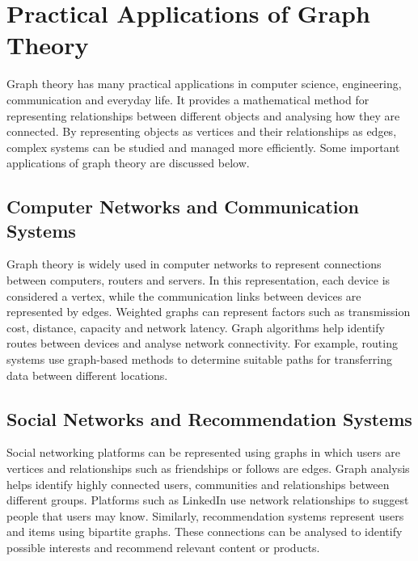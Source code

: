 \documentclass[12pt,a4paper]{article}
\begin{document}

\section{Practical Applications of Graph Theory}

Graph theory has many practical applications in computer science,
engineering, communication and everyday life. It provides a
mathematical method for representing relationships between
different objects and analysing how they are connected. By
representing objects as vertices and their relationships as
edges, complex systems can be studied and managed more
efficiently. Some important applications of graph theory are
discussed below.

\subsection{Computer Networks and Communication Systems}

Graph theory is widely used in computer networks to represent
connections between computers, routers and servers. In this
representation, each device is considered a vertex, while the
communication links between devices are represented by edges.
Weighted graphs can represent factors such as transmission
cost, distance, capacity and network latency. Graph algorithms
help identify routes between devices and analyse network
connectivity. For example, routing systems use graph-based
methods to determine suitable paths for transferring data
between different locations.

\subsection{Social Networks and Recommendation Systems}

Social networking platforms can be represented using graphs
in which users are vertices and relationships such as friendships
or follows are edges. Graph analysis helps identify highly
connected users, communities and relationships between
different groups. Platforms such as LinkedIn use network
relationships to suggest people that users may know. Similarly,
recommendation systems represent users and items using
bipartite graphs. These connections can be analysed to identify
possible interests and recommend relevant content or products.
\end{document}
